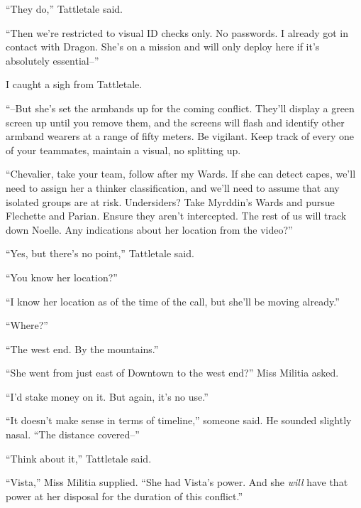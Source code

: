 ``They do,'' Tattletale said.



``Then we're restricted to visual ID checks only.  No passwords.  I already got in contact with Dragon.  She's on a mission and will only deploy here if it's absolutely essential--''



I caught a sigh from Tattletale.



``--But she's set the armbands up for the coming conflict.  They'll display a green screen up until you remove them, and the screens will flash and identify other armband wearers at a range of fifty meters.  Be vigilant.  Keep track of every one of your teammates, maintain a visual, no splitting up.



``Chevalier, take your team, follow after my Wards.  If she can detect capes, we'll need to assign her a thinker classification, and we'll need to assume that any isolated groups are at risk.  Undersiders?  Take Myrddin's Wards and pursue Flechette and Parian.  Ensure they aren't intercepted.  The rest of us will track down Noelle.  Any indications about her location from the video?''



``Yes, but there's no point,'' Tattletale said.



``You know her location?''



``I know her location as of the time of the call, but she'll be moving already.''



``Where?''



``The west end.  By the mountains.''



``She went from just east of Downtown to the west end?'' Miss Militia asked.



``I'd stake money on it.  But again, it's no use.''



``It doesn't make sense in terms of timeline,'' someone said.  He sounded slightly nasal.  ``The distance covered--''



``Think about it,'' Tattletale said.



``Vista,'' Miss Militia supplied.  ``She had Vista's power.  And she \emph{will} have that power at her disposal for the duration of this conflict.''



